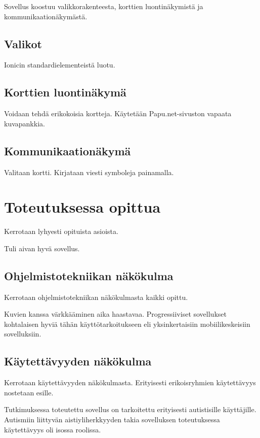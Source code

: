 \documentclass[utf8]{gradu3}
\begin{document}
Sovellus koostuu valikkorakenteesta, korttien luontinäkymistä ja kommunikaationäkymästä.

\section{Valikot}

Ionicin standardielementeistä luotu.

\section{Korttien luontinäkymä}

Voidaan tehdä erikokoisia kortteja. Käytetään Papu.net-sivuston vapaata kuvapankkia.

\section{Kommunikaationäkymä}

Valitaan kortti. Kirjataan viesti symboleja painamalla.

\chapter{Toteutuksessa opittua}

Kerrotaan lyhyesti opituista asioista.

Tuli aivan hyvä sovellus.

\section{Ohjelmistotekniikan näkökulma}

Kerrotaan ohjelmistotekniikan näkökulmasta kaikki opittu.

Kuvien kanssa värkkääminen aika haastavaa. Progressiiviset sovellukset kohtalaisen hyviä tähän käyttötarkoitukseen eli yksinkertaisiin mobiilikeskeisiin sovelluksiin.

\section{Käytettävyyden näkökulma}

Kerrotaan käytettävyyden näkökulmasta. Erityisesti erikoisryhmien käytettävyys nostetaan esille.

Tutkimuksessa toteutettu sovellus on tarkoitettu erityisesti autistisille käyttäjille. Autismiin liittyvän aistiyliherkkyyden takia sovelluksen toteutuksessa käytettävyys oli isossa roolissa.
\end{document}
